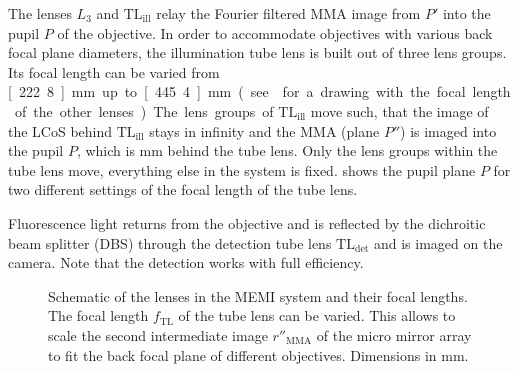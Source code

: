 The lenses $L_3$ and $\textrm{TL}_\textrm{ill}$ relay the Fourier
filtered MMA image from $P'$ into the pupil $P$ of the objective. In
order to accommodate objectives with various back focal plane
diameters, the illumination tube lens is built out of three lens
groups. Its focal length can be varied from \unit[222.8]{mm} up to
\unit[445.4]{mm} (see  for a drawing with the
focal length of the other lenses). The lens groups of
$\textrm{TL}_\textrm{ill}$ move such, that the image of the LCoS
behind $\textrm{TL}_\textrm{ill}$ stays in infinity and the MMA
(plane $P''$) is imaged into the pupil $P$, which is \unit[250]{mm}
behind the tube lens. Only the lens groups within the tube lens
move, everything else in the system is
fixed.  shows the pupil plane $P$ for two
different settings of the focal length of the tube lens.

Fluorescence light returns from the objective and is reflected by the
dichroitic beam splitter (DBS) through the detection tube lens
$\textrm{TL}_\textrm{det}$ and is imaged on the camera. Note that the
detection works with full efficiency.

\begin{figure}
   \centering
   \def\svgscale{2}
   
   \caption{Schematic of the lenses in the MEMI system and their focal
     lengths. The focal length $f_\textrm{TL}$ of the tube lens can be
     varied. This allows to scale the second intermediate image
     $r''_\textrm{MMA}$ of the micro mirror array to fit the back
     focal plane of different objectives. Dimensions in mm.}
   \label{fig:memi-sketch}
 \end{figure}
 




